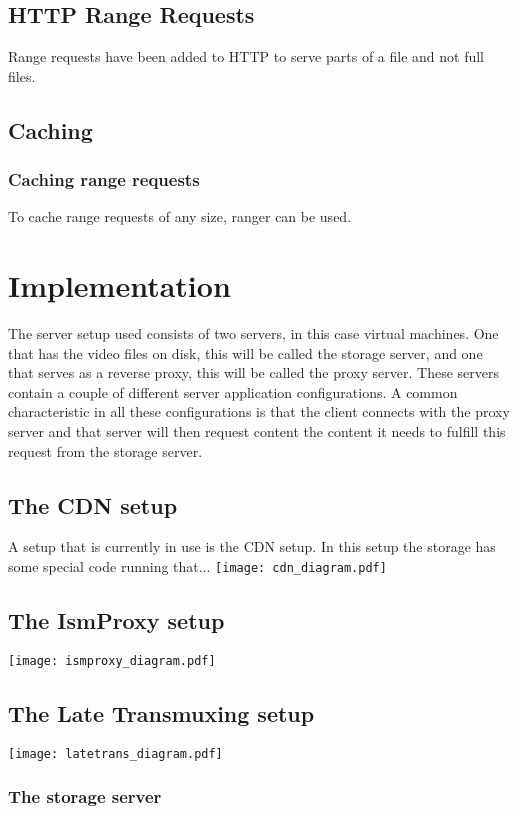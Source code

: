\documentclass[twoside,openright]{uva-bachelor-thesis}
\begin{document}
\section{HTTP Range Requests}
Range requests have been added to HTTP to serve parts of a file and not full
files.~\autocite{rangerequests}
\section{Caching}
\subsection{Caching range requests}
To cache range requests of any size, ranger \autocite{ranger} can be used.



\chapter{Implementation}
The server setup used consists of two servers, in this case virtual machines.
One that has the video files on disk, this will be called the storage server,
and one that serves as a reverse proxy, this will be called the proxy server.
These servers contain a couple of different server application configurations.
A common characteristic in all these configurations is that the client connects
with the proxy server and that server will then request content the content it
needs to fulfill this request from the storage server.


\section{The CDN setup}
A setup that is currently in use is the CDN setup. In this setup the storage has
some special code running that...
\texttt{[image: cdn\_diagram.pdf]}

\section{The IsmProxy setup}
\texttt{[image: ismproxy\_diagram.pdf]}

\section{The Late Transmuxing setup}

\texttt{[image: latetrans\_diagram.pdf]}
\subsection{The storage server}
\end{document}
